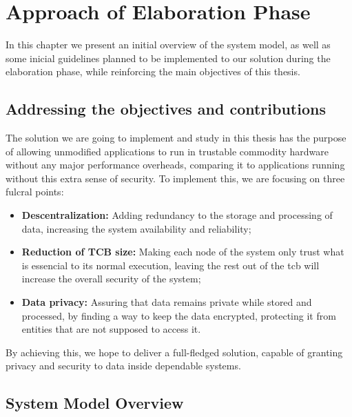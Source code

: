 \chapter{Approach of Elaboration Phase}
\label{cha:approach_of_elaboration_phase}

In this chapter we present an initial overview of the system model, as well as some inicial guidelines planned to be implemented to our solution during the elaboration phase, while reinforcing the main objectives of this thesis.

\section{Addressing the objectives and contributions} %
\label{sec:document_structure}

The solution we are going to implement and study in this thesis has the purpose of allowing unmodified applications to run in trustable commodity hardware without any major performance overheads, comparing it to applications running without this extra sense of security. To implement this, we are focusing on three fulcral points:
\begin{itemize}
	\item \textbf{Descentralization:}  Adding redundancy to the storage and processing of data, increasing the system availability and reliability;
	\item \textbf{Reduction of TCB size:}  Making each node of the system only trust what is essencial to its normal execution, leaving the rest out of the \gls{tcb} will increase the overall security of the system;
	\item \textbf{Data privacy:}  Assuring that data remains private while stored and processed, by finding a way to keep the data encrypted, protecting it from entities that are not supposed to access it.
\end{itemize}
By achieving this, we hope to deliver a full-fledged solution, capable of granting privacy and security to data inside dependable systems.




\section{System Model Overview} %
\label{sec:dealing_with_bibliogrpahy}

